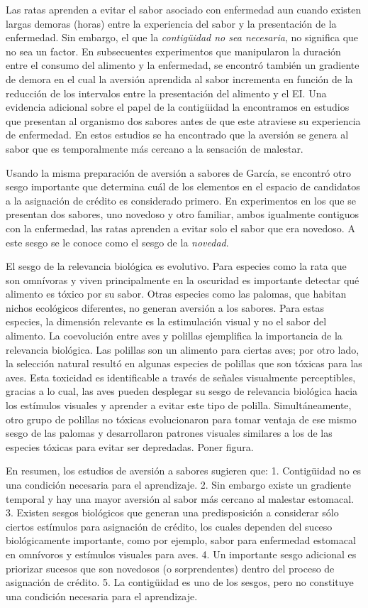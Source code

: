 \documentclass[
  a4paper,
  DIV=11,
  numbers=noendperiod]{scrreprt}
\begin{document}
Las ratas aprenden a evitar el sabor asociado con enfermedad aun cuando
existen largas demoras (horas) entre la experiencia del sabor y la
presentación de la enfermedad. Sin embargo, el que la \emph{contigüidad
no sea necesaria}, no significa que no sea un factor. En subsecuentes
experimentos que manipularon la duración entre el consumo del alimento y
la enfermedad, se encontró también un gradiente de demora en el cual la
aversión aprendida al sabor incrementa en función de la reducción de los
intervalos entre la presentación del alimento y el EI. Una evidencia
adicional sobre el papel de la contigüidad la encontramos en estudios
que presentan al organismo dos sabores antes de que este atraviese su
experiencia de enfermedad. En estos estudios se ha encontrado que la
aversión se genera al sabor que es temporalmente más cercano a la
sensación de malestar.

Usando la misma preparación de aversión a sabores de García, se encontró
otro sesgo importante que determina cuál de los elementos en el espacio
de candidatos a la asignación de crédito es considerado primero. En
experimentos en los que se presentan dos sabores, uno novedoso y otro
familiar, ambos igualmente contiguos con la enfermedad, las ratas
aprenden a evitar solo el sabor que era novedoso. A este sesgo se le
conoce como el sesgo de la \emph{novedad}.

El sesgo de la relevancia biológica es evolutivo. Para especies como la
rata que son omnívoras y viven principalmente en la oscuridad es
importante detectar qué alimento es tóxico por su sabor. Otras especies
como las palomas, que habitan nichos ecológicos diferentes, no generan
aversión a los sabores. Para estas especies, la dimensión relevante es
la estimulación visual y no el sabor del alimento. La coevolución entre
aves y polillas ejemplifica la importancia de la relevancia biológica.
Las polillas son un alimento para ciertas aves; por otro lado, la
selección natural resultó en algunas especies de polillas que son
tóxicas para las aves. Esta toxicidad es identificable a través de
señales visualmente perceptibles, gracias a lo cual, las aves pueden
desplegar su sesgo de relevancia biológica hacia los estímulos visuales
y aprender a evitar este tipo de polilla. Simultáneamente, otro grupo de
polillas no tóxicas evolucionaron para tomar ventaja de ese mismo sesgo
de las palomas y desarrollaron patrones visuales similares a los de las
especies tóxicas para evitar ser depredadas. Poner figura.

En resumen, los estudios de aversión a sabores sugieren que: 1.
Contigüidad no es una condición necesaria para el aprendizaje. 2. Sin
embargo existe un gradiente temporal y hay una mayor aversión al sabor
más cercano al malestar estomacal. 3. Existen sesgos biológicos que
generan una predisposición a considerar sólo ciertos estímulos para
asignación de crédito, los cuales dependen del suceso biológicamente
importante, como por ejemplo, sabor para enfermedad estomacal en
omnívoros y estímulos visuales para aves. 4. Un importante sesgo
adicional es priorizar sucesos que son novedosos (o sorprendentes)
dentro del proceso de asignación de crédito. 5. La contigüidad es uno de
los sesgos, pero no constituye una condición necesaria para el
aprendizaje.
\end{document}
